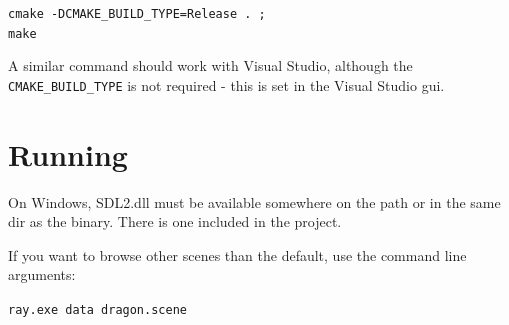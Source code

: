 \verb|cmake -DCMAKE_BUILD_TYPE=Release . ;| \\
\verb|make|

A similar command should work with Visual Studio, although the \verb|CMAKE_BUILD_TYPE| is not required - this is set in the Visual Studio gui.


\section{Running}

On Windows, SDL2.dll must be available somewhere on the path or in the same dir as the binary. 
There is one included in the project.

If you want to browse other scenes than the default, use the command line arguments:

\verb|ray.exe data dragon.scene|

